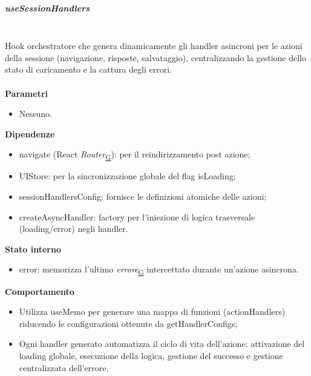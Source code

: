 \documentclass[a4paper,12pt]{article}
\begin{document}
                \subparagraph{useSessionHandlers}\mbox{}\\
                Hook orchestratore che genera dinamicamente gli handler asincroni per le azioni della sessione (navigazione, risposte, salvataggio), centralizzando la gestione dello stato di caricamento e la cattura degli errori.\\\\
                \textbf{Parametri}
                \begin{itemize}
                    \item Nessuno.
                \end{itemize}
                \textbf{Dipendenze}
                \begin{itemize}
                    \item {\ttfamily navigate} (React \textit{Router}\textsubscript{\href{https://atlasteam9.github.io/Atlas/glossario.html\#Router}{G}}): per il reindirizzamento post azione;
                    \item {\ttfamily UIStore}: per la sincronizzazione globale del flag {\ttfamily isLoading};
                    \item {\ttfamily sessionHandlersConfig}: fornisce le definizioni atomiche delle azioni;
                    \item {\ttfamily createAsyncHandler}: factory per l'iniezione di logica trasversale (loading/error) negli handler.
                \end{itemize}
                \textbf{Stato interno}
                \begin{itemize}
                    \item {\ttfamily error}: memorizza l'ultimo \textit{errore}\textsubscript{\href{https://atlasteam9.github.io/Atlas/glossario.html\#Errore}{G}} intercettato durante un'azione asincrona.
                \end{itemize}
                \textbf{Comportamento}
                \begin{itemize}
                    \item Utilizza {\ttfamily useMemo} per generare una mappa di funzioni ({\ttfamily actionHandlers}) riducendo le configurazioni ottenute da {\ttfamily getHandlerConfigs};
                    \item Ogni handler generato automatizza il ciclo di vita dell'azione: attivazione del loading globale, esecuzione della logica, gestione del successo e gestione centralizzata dell'errore.
                \end{itemize}
\end{document}
